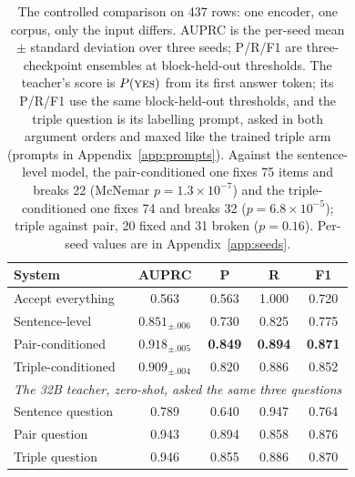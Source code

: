 \documentclass[11pt]{article}
\begin{document}
\begin{table}[t]\centering\small
\setlength{\tabcolsep}{3.2pt}
\begin{tabular}{lcccc}
\toprule
System & AUPRC & P & R & F1 \\
\midrule
Accept everything  & 0.563 & 0.563 & 1.000 & 0.720 \\
Sentence-level     & $0.851_{\pm .006}$ & 0.730 & 0.825 & 0.775 \\
Pair-conditioned   & $\mathbf{0.918}_{\pm .005}$ & \textbf{0.849} & \textbf{0.894} & \textbf{0.871} \\
Triple-conditioned & $0.909_{\pm .004}$ & 0.820 & 0.886 & 0.852 \\
\midrule
\multicolumn{5}{l}{\emph{The 32B teacher, zero-shot, asked the same three questions}} \\
Sentence question & 0.789 & 0.640 & 0.947 & 0.764 \\
Pair question     & 0.943 & 0.894 & 0.858 & 0.876 \\
Triple question   & 0.946 & 0.855 & 0.886 & 0.870 \\
\bottomrule
\end{tabular}
\caption{The controlled comparison on 437 rows: one encoder, one corpus, only the input differs.
AUPRC is the per-seed mean $\pm$ standard deviation over three seeds; P/R/F1 are three-checkpoint
ensembles at block-held-out thresholds. The teacher's score is $P(\textsc{yes})$ from its first
answer token; its P/R/F1 use the same block-held-out thresholds, and the triple question is its
labelling prompt, asked in both argument orders and maxed like the trained triple arm
(prompts in Appendix~\ref{app:prompts}). Against the sentence-level model, the pair-conditioned one
fixes 75 items and breaks 22 (McNemar $p = 1.3\times10^{-7}$) and the triple-conditioned one fixes 74
and breaks 32 ($p = 6.8\times10^{-5}$); triple against pair, 20 fixed and 31 broken ($p = 0.16$). Per-seed values are in Appendix~\ref{app:seeds}.}
\label{tab:main}
\end{table}
\end{document}
